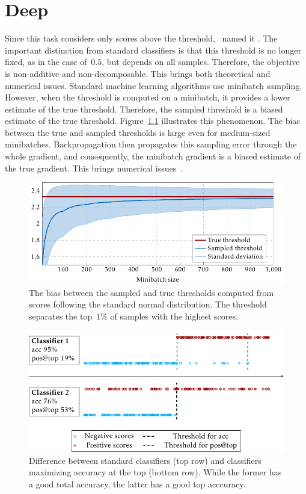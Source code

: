 \chapter{Deep}\label{chap: deep}

Since this task considers only scores above the threshold,~\cite{boyd2012accuracy} named it \AccatTop. The important distinction from standard classifiers is that this threshold is no longer fixed, as in the case of~$0.5$, but depends on all samples. Therefore, the objective is non-additive and non-decomposable. This brings both theoretical and numerical issues. Standard machine learning algorithms use minibatch sampling. However, when the threshold is computed on a minibatch, it provides a lower estimate of the true threshold. Therefore, the sampled threshold is a biased estimate of the true threshold. Figure~\ref{fig:thresholds1} illustrates this phenomenon. The bias between the true and sampled thresholds is large even for medium-sized minibatches. Backpropagation then propagates this sampling error through the whole gradient, and consequently, the minibatch gradient is a biased estimate of the true gradient. This brings numerical issues~\cite{bottou2018optimization}.

\begin{figure}[!ht]
  \centering
  \includegraphics[width = \linewidth]{images/deep_threshold_bias.pdf}
  \caption{The bias between the sampled and true thresholds computed from scores following the standard normal distribution. The threshold separates the top~$1\%$ of samples with the highest scores.}
  \label{fig:thresholds1}
\end{figure}

\begin{figure}[!ht]
  \centering
  \includegraphics[width = \linewidth]{images/standard_aatp_comparison.pdf}
  \caption{Difference between standard classifiers (top row) and classifiers maximizing accuracy at the top (bottom row). While the former has a good total accuracy, the latter has a good top acccuracy.}
  \label{fig:difference}
\end{figure}

